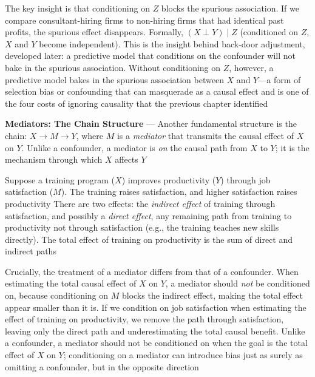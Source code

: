 The key insight is that conditioning on $Z$ blocks the spurious association. If we
compare consultant-hiring firms to non-hiring firms that had identical past profits,
the spurious effect disappears. Formally, $(X \perp Y) \mid Z$ (conditioned on $Z$,
$X$ and $Y$ become independent). This is the insight behind back-door adjustment,
developed later: a predictive model that conditions on the confounder will not
bake in the spurious association. Without conditioning on $Z$, however, a predictive
model bakes in the spurious association between $X$ and $Y$—a form of selection
bias or confounding that can masquerade as a causal effect and is one of the
four costs of ignoring causality that the previous chapter identified


\textbf{Mediators: The Chain Structure} --- Another fundamental structure is the
chain: $X \rightarrow M \rightarrow Y$, where $M$ is a \emph{mediator} that
transmits the causal effect of $X$ on $Y$. Unlike a confounder, a mediator is
\emph{on} the causal path from $X$ to $Y$; it is the mechanism through which $X$
affects $Y$

Suppose a training program ($X$) improves productivity ($Y$) through job satisfaction
($M$). The training raises satisfaction, and higher satisfaction raises productivity
There are two effects: the \emph{indirect effect} of training through
satisfaction, and possibly a \emph{direct effect}, any remaining path from training
to productivity not through satisfaction (e.g., the training teaches new skills
directly). The total effect of training on productivity is the sum of direct and
indirect paths

Crucially, the treatment of a mediator differs from that of a confounder. When estimating
the total causal effect of $X$ on $Y$, a mediator should \emph{not} be conditioned
on, because conditioning on $M$ blocks the indirect effect, making the total effect
appear smaller than it is. If we condition on job satisfaction when estimating
the effect of training on productivity, we remove the path through satisfaction,
leaving only the direct path and underestimating the total causal benefit. Unlike
a confounder, a mediator should not be conditioned on when the goal is the total
effect of $X$ on $Y$; conditioning on a mediator can introduce bias just as surely
as omitting a confounder, but in the opposite direction

